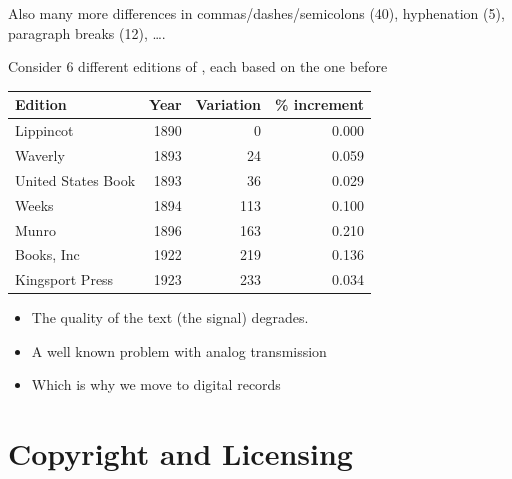 \documentclass[a4paper,landscape,headrule,footrule,xetex]{foils}
\begin{document}
Also many more differences in commas/dashes/semicolons (40),
hyphenation (5),  paragraph breaks (12), \ldots .


Consider 6 different editions of , each based on the one before

\begin{tabular}{lrrr}
  Edition & Year & Variation & \% increment \\
\hline
  Lippincot          & 1890 & 0   & 0.000 \\ 
  Waverly            & 1893 & 24  & 0.059 \\
  United States Book & 1893 & 36  & 0.029 \\
  Weeks              & 1894 & 113 & 0.100 \\
  Munro              & 1896 & 163 & 0.210 \\
  Books, Inc         & 1922 & 219 & 0.136 \\
  Kingsport Press    & 1923 & 233 & 0.034 
\end{tabular}

\begin{itemize}
\item The quality of the text (the signal) degrades.
\item A well known problem with analog transmission
\item Which is why we move to digital records
\end{itemize}


\section{Copyright and Licensing}
\end{document}
